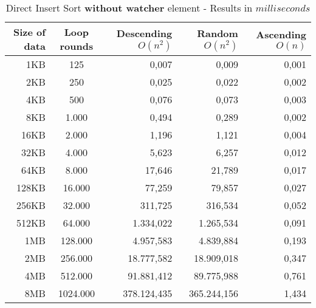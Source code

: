 \documentclass[11pt]{amsart}
\begin{document}
\begin{table}[htdp]
	\caption{Direct Insert Sort \textbf{without watcher} element - Results in $milliseconds$}
	\begin{tabular}{|r|c|r|r|r|} \hline
		Size of data & Loop rounds & \parbox[c]{3.5cm}{Descending \\ $O(n^2)$} & \parbox[c]{3.5cm}{Random \\$O(n^2)$} & \parbox[c]{3.5cm}{Ascending \\ $O(n)$} \\ \hline
		1KB & 125 & 0,007 & 0,009 & 0,001 \\ \hline
		2KB & 250 & 0,025 & 0,022 & 0,002 \\ \hline
		4KB & 500 & 0,076 & 0,073 & 0,003 \\ \hline
		8KB & 1.000 & 0,494 & 0,289 & 0,002 \\ \hline
		16KB & 2.000 & 1,196 & 1,121 & 0,004 \\ \hline
		32KB & 4.000 & 5,623 & 6,257 & 0,012 \\ \hline
		64KB & 8.000 & 17,646 & 21,789 & 0,017 \\ \hline
		128KB & 16.000 & 77,259 & 79,857 & 0,027 \\ \hline
		256KB & 32.000 & 311,725 & 316,534 & 0,052 \\ \hline
		512KB & 64.000 & 1.334,022 & 1.265,534 & 0,091 \\ \hline
		1MB & 128.000 &  4.957,583 & 4.839,884 & 0,193 \\ \hline
		2MB & 256.000 & 18.777,582 & 18.909,018 & 0,347 \\ \hline
		4MB & 512.000 & 91.881,412 & 89.775,988 & 0,761 \\ \hline
		8MB & 1024.000 & 378.124,435 & 365.244,156 & 1,434 \\ \hline
	\end{tabular}
	\label{default}
\end{table}%
\end{document}
